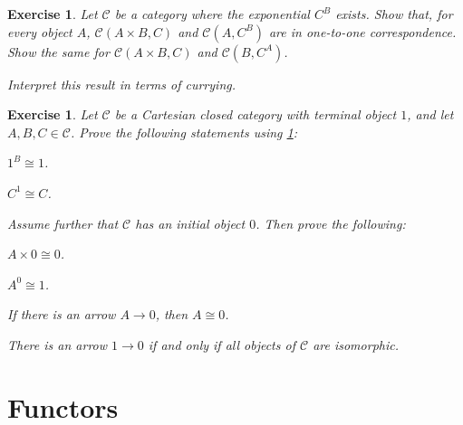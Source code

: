 \documentclass[article, a4paper, 11pt, oneside]{memoir}
\numberwithin{equation}{chapter}
\newcommand{\cat}[1]{\mathcal{#1}}
\newcommand{\ncat}[1]{\mathbf{#1}} %
\newcommand{\catC}{\cat{C}}
\theoremstyle{myexample}
\newtheorem{exercise}[theorem]{Exercise}
\theoremstyle{myexamplebreak}
\begin{document}
\begin{exercise}
    \label{exer:exponential_onetoone}
    Let $\catC$ be a category where the exponential $C^B$ exists. Show that, for every object $A$, $\catC(A \times B, C)$ and $\catC(A, C^B)$ are in one-to-one correspondence. Show the same for $\catC(A \times B, C)$ and $\catC(B, C^A)$.

    Interpret this result in terms of currying.
\end{exercise}


\begin{exercise}
    Let $\catC$ be a Cartesian closed category with terminal object $1$, and let $A,B,C \in \catC$. Prove the following statements using \cref{exer:exponential_onetoone}:
    \begin{enumexercise}
        \item $1^B \cong 1$.

        \item $C^1 \cong C$.
    \end{enumexercise}
    Assume further that $\catC$ has an initial object $0$. Then prove the following:
    \begin{enumexercise}[resume]
        \item $A \times 0 \cong 0$.

        \item $A^0 \cong 1$.

        \item If there is an arrow $A \to 0$, then $A \cong 0$.

        \item \label{exer:CCC_all_objects_isomorphic} There is an arrow $1 \to 0$ if and only if all objects of $\catC$ are isomorphic.
    \end{enumexercise}
\end{exercise}


\chapter{Functors}

\newcommand{\catCatSm}{\ncat{Cat}} %
\newcommand{\catCatLocSm}{\ncat{Cat}^*} %
\newcommand{\catCatFlex}{\mathbf{C}\textsc{\textbf{at}}} %
\newcommand{\DistTo}{\xrightarrow{
   \,\smash{\raisebox{-0.65ex}{\ensuremath{\scriptstyle\sim}}}\,}}
\end{document}
